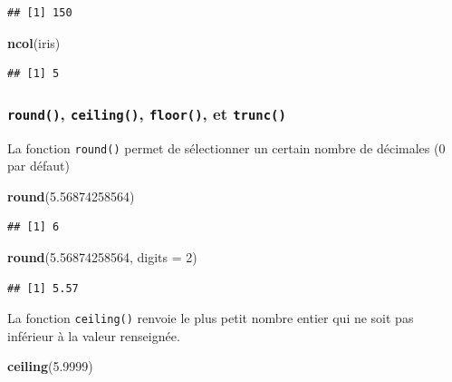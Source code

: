 \documentclass[
]{book}
\newenvironment{Shaded}{\begin{snugshade}}{\end{snugshade}}
\newcommand{\DataTypeTok}[1]{\textcolor[rgb]{0.13,0.29,0.53}{#1}}
\newcommand{\DecValTok}[1]{\textcolor[rgb]{0.00,0.00,0.81}{#1}}
\newcommand{\FloatTok}[1]{\textcolor[rgb]{0.00,0.00,0.81}{#1}}
\newcommand{\KeywordTok}[1]{\textcolor[rgb]{0.13,0.29,0.53}{\textbf{#1}}}
\newcommand{\NormalTok}[1]{#1}
\begin{document}
\begin{verbatim}
## [1] 150
\end{verbatim}

\begin{Shaded}
\begin{Highlighting}[]
\KeywordTok{ncol}\NormalTok{(iris)}
\end{Highlighting}
\end{Shaded}

\begin{verbatim}
## [1] 5
\end{verbatim}

\hypertarget{l015round}{%
\subsubsection{\texorpdfstring{\texttt{round()}, \texttt{ceiling()}, \texttt{floor()}, et \texttt{trunc()}}{round(), ceiling(), floor(), et trunc()}}\label{l015round}}

La fonction \texttt{round()} permet de sélectionner un certain nombre de décimales (0 par défaut)

\begin{Shaded}
\begin{Highlighting}[]
\KeywordTok{round}\NormalTok{(}\FloatTok{5.56874258564}\NormalTok{)}
\end{Highlighting}
\end{Shaded}

\begin{verbatim}
## [1] 6
\end{verbatim}

\begin{Shaded}
\begin{Highlighting}[]
\KeywordTok{round}\NormalTok{(}\FloatTok{5.56874258564}\NormalTok{, }\DataTypeTok{digits =} \DecValTok{2}\NormalTok{)}
\end{Highlighting}
\end{Shaded}

\begin{verbatim}
## [1] 5.57
\end{verbatim}

La fonction \texttt{ceiling()} renvoie le plus petit nombre entier qui ne soit pas inférieur à la valeur renseignée.

\begin{Shaded}
\begin{Highlighting}[]
\KeywordTok{ceiling}\NormalTok{(}\FloatTok{5.9999}\NormalTok{)}
\end{Highlighting}
\end{Shaded}
\end{document}
